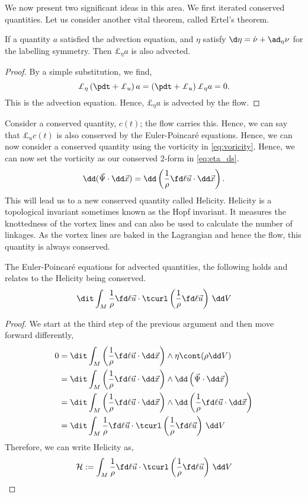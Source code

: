 \noindent
We now present two significant ideas in this area. We first iterated conserved quantities. Let us consider another vital theorem, called Ertel's theorem.
\begin{nthm}
  If a quantity $a$ satisfied the advection equation, and $\eta$ satisfy $\d\eta = \dot \nu + \ad_{\eta}\nu$ for the labelling symmetry. Then $\pounds_\eta a$ is also advected.
\end{nthm}
\begin{proof}
  By a simple substitution, we find,
  $$ \pounds_\eta \left(\pdt + \pounds_u \right)a = \left(\pdt + \pounds_u\right)\pounds_\eta a = 0. $$
  This is the advection equation. Hence, $\pounds_\eta a$ is advected by the flow.
\end{proof}
\noindent
Consider a conserved quantity, $c(t)$; the flow carries this. Hence, we can say that $\pounds_u c(t)$ is also conserved by the Euler-Poincar\'e equations. Hence, we can now consider a conserved quantity using the vorticity in \eqref{eq:voricity}. Hence, we can now set the vorticity as our conserved 2-form in \eqref{eq:eta_ds}.
$$ \dd (\vec\Psi \cdot \dd \vec x) = \dd \left( \frac{1}{\rho}\fd \ell {\vec u} \cdot \dd \vec x \right). $$
This will lead us to a new conserved quantity called Helicity. Helicity is a topological invariant sometimes known as the Hopf invariant. It measures the knottedness of the vortex lines and can also be used to calculate the number of linkages. As the vortex lines are baked in the Lagrangian and hence the flow, this quantity is always conserved.
\begin{nlemma}
  The Euler-Poincar\'e equations for advected quantities, the following holds and relates to the Helicity being conserved.
  $$ \dit\int_M \frac{1}{\rho} \fd \ell {\vec u} \cdot \tcurl\left( \frac{1}{\rho} \fd \ell {\vec u} \right) \,\dd V $$
\end{nlemma}
\begin{proof}
  We start at the third step of the previous argument and then move forward differently,
  \begin{align*}
    0 &= \dit \int_M \left(\frac{1}{\rho}\fd \ell {\vec u} \cdot \dd \vec x\right) \wedge \eta \cont (\rho \dd V) \\
    &= \dit \int_M \left(\frac{1}{\rho}\fd \ell {\vec u} \cdot \dd \vec x\right) \wedge \dd\left( \vec\Psi \cdot \dd \vec x \right) \\
    &= \dit \int_M \left(\frac{1}{\rho}\fd \ell {\vec u} \cdot \dd \vec x\right) \wedge \dd \left( \frac{1}{\rho}\fd \ell {\vec u} \cdot \dd \vec x \right) \\
    &= \dit \int_M \frac{1}{\rho}\fd \ell {\vec u} \cdot \tcurl \left( \frac{1}{\rho}\fd \ell {\vec u} \right)\,\dd V
  \end{align*}
  Therefore, we can write Helicity as,
  $$ \mathcal{H} := \int_M \frac{1}{\rho}\fd \ell {\vec u} \cdot \tcurl \left( \frac{1}{\rho}\fd \ell {\vec u} \right)\,\dd V $$
\end{proof}

